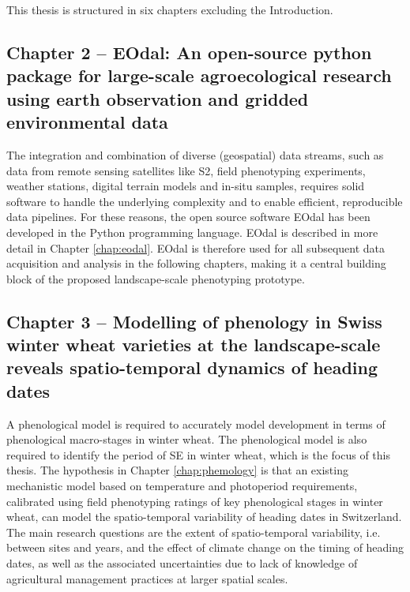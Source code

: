This thesis is structured in six chapters excluding the Introduction.

\subsection*{Chapter 2 -- EOdal: An open-source python package for large-scale agroecological research using earth observation and gridded environmental data}
The integration and combination of diverse (geospatial) data streams, such as data from remote sensing satellites like \gls{S2}, field phenotyping experiments, weather stations, digital terrain models and in-situ samples, requires solid software to handle the underlying complexity and to enable efficient, reproducible data pipelines. For these reasons, the open source software \gls{EOdal} has been developed in the Python programming language. \gls{EOdal} is described in more detail in Chapter \ref{chap:eodal}. \gls{EOdal} is therefore used for all subsequent data acquisition and analysis in the following chapters, making it a central building block of the proposed landscape-scale phenotyping prototype.

\subsection*{Chapter 3 -- Modelling of phenology in Swiss winter wheat varieties at the landscape-scale reveals spatio-temporal dynamics of heading dates}
A phenological model is required to accurately model development in terms of phenological macro-stages in winter wheat. The phenological model is also required to identify the period of \gls{SE} in winter wheat, which is the focus of this thesis. The hypothesis in Chapter \ref{chap:phemology} is that an existing mechanistic model based on temperature and photoperiod requirements, calibrated using field phenotyping ratings of key phenological stages in winter wheat, can model the spatio-temporal variability of heading dates in Switzerland. The main research questions are the extent of spatio-temporal variability, i.e. between sites and years, and the effect of climate change on the timing of heading dates, as well as the associated uncertainties due to lack of knowledge of agricultural management practices at larger spatial scales.

